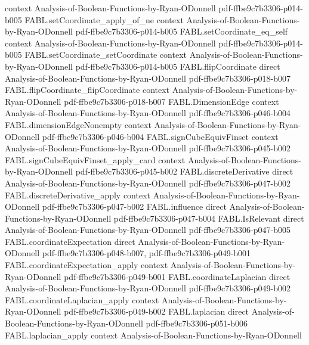 \begin{theorem}
  {context}
  {Analysis-of-Boolean-Functions-by-Ryan-ODonnell}
  {pdf-ffbe9c7b3306-p014-b005}
\proofstep
  {FABL.setCoordinate_apply_of_ne}
  {context}
  {Analysis-of-Boolean-Functions-by-Ryan-ODonnell}
  {pdf-ffbe9c7b3306-p014-b005}
\proofstep
  {FABL.setCoordinate_eq_self}
  {context}
  {Analysis-of-Boolean-Functions-by-Ryan-ODonnell}
  {pdf-ffbe9c7b3306-p014-b005}
\proofstep
  {FABL.setCoordinate_setCoordinate}
  {context}
  {Analysis-of-Boolean-Functions-by-Ryan-ODonnell}
  {pdf-ffbe9c7b3306-p014-b005}
\proofstep
  {FABL.flipCoordinate}
  {direct}
  {Analysis-of-Boolean-Functions-by-Ryan-ODonnell}
  {pdf-ffbe9c7b3306-p018-b007}
\proofstep
  {FABL.flipCoordinate_flipCoordinate}
  {context}
  {Analysis-of-Boolean-Functions-by-Ryan-ODonnell}
  {pdf-ffbe9c7b3306-p018-b007}
\proofstep
  {FABL.DimensionEdge}
  {context}
  {Analysis-of-Boolean-Functions-by-Ryan-ODonnell}
  {pdf-ffbe9c7b3306-p046-b004}
\proofstep
  {FABL.dimensionEdgeNonempty}
  {context}
  {Analysis-of-Boolean-Functions-by-Ryan-ODonnell}
  {pdf-ffbe9c7b3306-p046-b004}
\proofstep
  {FABL.signCubeEquivFinset}
  {context}
  {Analysis-of-Boolean-Functions-by-Ryan-ODonnell}
  {pdf-ffbe9c7b3306-p045-b002}
\proofstep
  {FABL.signCubeEquivFinset_apply_card}
  {context}
  {Analysis-of-Boolean-Functions-by-Ryan-ODonnell}
  {pdf-ffbe9c7b3306-p045-b002}
\proofstep
  {FABL.discreteDerivative}
  {direct}
  {Analysis-of-Boolean-Functions-by-Ryan-ODonnell}
  {pdf-ffbe9c7b3306-p047-b002}
\proofstep
  {FABL.discreteDerivative_apply}
  {context}
  {Analysis-of-Boolean-Functions-by-Ryan-ODonnell}
  {pdf-ffbe9c7b3306-p047-b002}
\proofstep
  {FABL.influence}
  {direct}
  {Analysis-of-Boolean-Functions-by-Ryan-ODonnell}
  {pdf-ffbe9c7b3306-p047-b004}
\proofstep
  {FABL.IsRelevant}
  {direct}
  {Analysis-of-Boolean-Functions-by-Ryan-ODonnell}
  {pdf-ffbe9c7b3306-p047-b005}
\proofstep
  {FABL.coordinateExpectation}
  {direct}
  {Analysis-of-Boolean-Functions-by-Ryan-ODonnell}
  {pdf-ffbe9c7b3306-p048-b007,
    pdf-ffbe9c7b3306-p049-b001}
\proofstep
  {FABL.coordinateExpectation_apply}
  {context}
  {Analysis-of-Boolean-Functions-by-Ryan-ODonnell}
  {pdf-ffbe9c7b3306-p049-b001}
\proofstep
  {FABL.coordinateLaplacian}
  {direct}
  {Analysis-of-Boolean-Functions-by-Ryan-ODonnell}
  {pdf-ffbe9c7b3306-p049-b002}
\proofstep
  {FABL.coordinateLaplacian_apply}
  {context}
  {Analysis-of-Boolean-Functions-by-Ryan-ODonnell}
  {pdf-ffbe9c7b3306-p049-b002}
\proofstep
  {FABL.laplacian}
  {direct}
  {Analysis-of-Boolean-Functions-by-Ryan-ODonnell}
  {pdf-ffbe9c7b3306-p051-b006}
\proofstep
  {FABL.laplacian_apply}
  {context}
  {Analysis-of-Boolean-Functions-by-Ryan-ODonnell}

\end{theorem}
